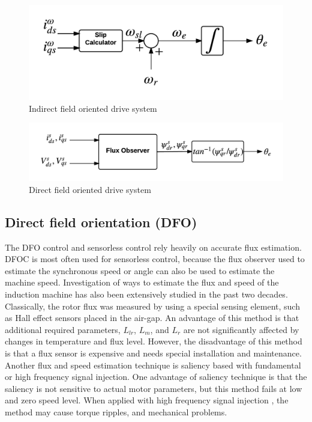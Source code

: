 \begin{figure}[h]
\centering
\includegraphics[scale=0.85]{chapter0/ifoc}
\caption{Indirect field oriented drive system}
\label{ifoc}
\end{figure}

\begin{figure}[h]
\centering
\includegraphics[scale=0.8]{chapter0/dfo}
\caption{Direct field oriented drive system}
\label{dfo}
\end{figure}

\subsection{Direct field orientation (DFO)}

The DFO control and sensorless control rely heavily on accurate flux estimation. DFOC is most often used for sensorless control, because the flux observer used to estimate the synchronous speed or angle can also be used to estimate the machine speed. Investigation of ways to estimate the flux and speed of the induction machine has also been extensively studied in the past two decades. Classically, the rotor flux was measured by using a special sensing element, such as Hall effect sensors placed in the air-gap. An advantage of this method is that additional required parameters, $L_{lr}$, $L_{m}$, and $L_{r}$ are not significantly affected by changes in temperature and flux level. However, the disadvantage of this method is that a flux sensor is expensive and needs special installation and maintenance. Another flux and speed estimation technique is saliency based with fundamental or high frequency signal injection. One advantage of saliency technique is that the saliency is not sensitive to actual motor parameters, but this method fails at low and zero speed level. When applied with high frequency signal injection \cite{jansen}, the method may cause torque ripples, and mechanical problems.\\

